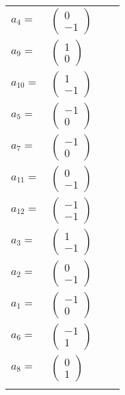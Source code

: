 \documentclass[1p]{elsarticle_modified}
\theoremstyle{definition}
\begin{document}
\begin{tabular}{m{7pt} m{180pt} m{7pt} m{180pt} }
\flushright $a_{4}=$&$\begin{pmatrix}0\\-1\end{pmatrix}$ \\
\flushright $a_{9}=$&$\begin{pmatrix}1\\0\end{pmatrix}$ \\
\flushright $a_{10}=$&$\begin{pmatrix}1\\-1\end{pmatrix}$ \\
\flushright $a_{5}=$&$\begin{pmatrix}-1\\0\end{pmatrix}$ \\
\flushright $a_{7}=$&$\begin{pmatrix}-1\\0\end{pmatrix}$ \\
\flushright $a_{11}=$&$\begin{pmatrix}0\\-1\end{pmatrix}$ \\
\flushright $a_{12}=$&$\begin{pmatrix}-1\\-1\end{pmatrix}$ \\
\flushright $a_{3}=$&$\begin{pmatrix}1\\-1\end{pmatrix}$ \\
\flushright $a_{2}=$&$\begin{pmatrix}0\\-1\end{pmatrix}$ \\
\flushright $a_{1}=$&$\begin{pmatrix}-1\\0\end{pmatrix}$ \\
\flushright $a_{6}=$&$\begin{pmatrix}-1\\1\end{pmatrix}$ \\
\flushright $a_{8}=$&$\begin{pmatrix}0\\1\end{pmatrix}$\\&\end{tabular}
\end{document}
